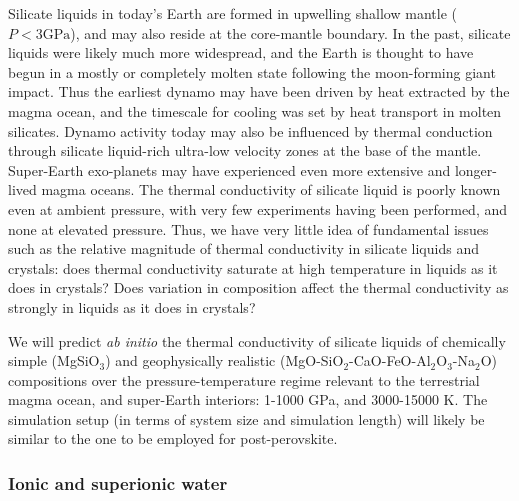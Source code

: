 Silicate liquids in today’s Earth are formed in upwelling shallow mantle ($P < 3 \mathrm{GPa}$), and may also reside at the core-mantle boundary.\cite{williamsgarnero_96} In the past, silicate liquids were likely much more widespread, and the Earth is thought to have begun in a mostly or completely molten state following the moon-forming giant impact.\cite{nakajimastevenson_15} Thus the earliest dynamo may have been driven by heat extracted by the magma ocean, and the timescale for cooling was set by heat transport in molten silicates. Dynamo activity today may also be influenced by thermal conduction through silicate liquid-rich ultra-low velocity zones at the base of the mantle. Super-Earth exo-planets may have experienced even more extensive and longer-lived magma oceans.\cite{stixrude_14} The thermal conductivity of silicate liquid is poorly known even at ambient pressure, with very few experiments having been performed,\cite{snyderetal_94} and none at elevated pressure. Thus, we have very little idea of fundamental issues such as the relative magnitude of thermal conductivity in silicate liquids and crystals: does thermal conductivity saturate at high temperature in liquids as it does in crystals? Does variation in composition affect the thermal conductivity as strongly in liquids as it does in crystals?

We will predict \emph{ab initio} the thermal conductivity of silicate liquids of chemically simple (MgSiO$_3$) and geophysically realistic (MgO-SiO$_2$-CaO-FeO-Al$_2$O$_3$-Na$_2$O) compositions over the pressure-tempe\-rature regime relevant to the terrestrial magma ocean, and super-Earth interiors: 1-1000 GPa, and 3000-15000 K. The simulation setup (in terms of system size and simulation length) will likely be similar to the one to be employed for post-perovskite.

\subsubsection{Ionic and superionic water}

